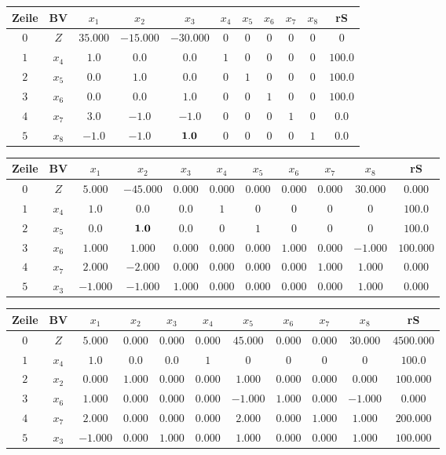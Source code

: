 \documentclass[a4paper]{article}
\begin{document}
\begin{tabular}{|c|c|ccc|ccccc|c|} \hline
Zeile & BV & $x_1$ &$x_2$ &$x_3$ &$x_4$ &$x_5$ &$x_6$ &$x_7$ &$x_8$ & rS \\ \hline
$0$ & $Z$ & $35.000$ &$-15.000$ &$-30.000$ &$0$ &$0$ &$0$ &$0$ &$0$ & $0$ \\ \hline
$1$ & $x_4$ & $1.0$ &$0.0$ &$0.0$ &$1$ &$0$ &$0$ &$0$ &$0$ & $100.0$ \\ 
$2$ & $x_5$ & $0.0$ &$1.0$ &$0.0$ &$0$ &$1$ &$0$ &$0$ &$0$ & $100.0$ \\ 
$3$ & $x_6$ & $0.0$ &$0.0$ &$1.0$ &$0$ &$0$ &$1$ &$0$ &$0$ & $100.0$ \\ 
$4$ & $x_7$ & $3.0$ &$-1.0$ &$-1.0$ &$0$ &$0$ &$0$ &$1$ &$0$ & $0.0$ \\ 
$5$ & $x_8$ & $-1.0$ &$-1.0$ &$\bf 1.0$ &$0$ &$0$ &$0$ &$0$ &$1$ & $0.0$ \\ 
\hline\end{tabular}

\begin{tabular}{|c|c|ccc|ccccc|c|} \hline
Zeile & BV & $x_1$ &$x_2$ &$x_3$ &$x_4$ &$x_5$ &$x_6$ &$x_7$ &$x_8$ & rS \\ \hline
$0$ & $Z$ & $5.000$ &$-45.000$ &$0.000$ &$0.000$ &$0.000$ &$0.000$ &$0.000$ &$30.000$ & $0.000$ \\ \hline
$1$ & $x_4$ & $1.0$ &$0.0$ &$0.0$ &$1$ &$0$ &$0$ &$0$ &$0$ & $100.0$ \\ 
$2$ & $x_5$ & $0.0$ &$\bf 1.0$ &$0.0$ &$0$ &$1$ &$0$ &$0$ &$0$ & $100.0$ \\ 
$3$ & $x_6$ & $1.000$ &$1.000$ &$0.000$ &$0.000$ &$0.000$ &$1.000$ &$0.000$ &$-1.000$ & $100.000$ \\ 
$4$ & $x_7$ & $2.000$ &$-2.000$ &$0.000$ &$0.000$ &$0.000$ &$0.000$ &$1.000$ &$1.000$ & $0.000$ \\ 
$5$ & $x_3$ & $-1.000$ &$-1.000$ &$1.000$ &$0.000$ &$0.000$ &$0.000$ &$0.000$ &$1.000$ & $0.000$ \\ 
\hline\end{tabular}

\begin{tabular}{|c|c|ccc|ccccc|c|} \hline
Zeile & BV & $x_1$ &$x_2$ &$x_3$ &$x_4$ &$x_5$ &$x_6$ &$x_7$ &$x_8$ & rS \\ \hline
$0$ & $Z$ & $5.000$ &$0.000$ &$0.000$ &$0.000$ &$45.000$ &$0.000$ &$0.000$ &$30.000$ & $4500.000$ \\ \hline
$1$ & $x_4$ & $1.0$ &$0.0$ &$0.0$ &$1$ &$0$ &$0$ &$0$ &$0$ & $100.0$ \\ 
$2$ & $x_2$ & $0.000$ &$1.000$ &$0.000$ &$0.000$ &$1.000$ &$0.000$ &$0.000$ &$0.000$ & $100.000$ \\ 
$3$ & $x_6$ & $1.000$ &$0.000$ &$0.000$ &$0.000$ &$-1.000$ &$1.000$ &$0.000$ &$-1.000$ & $0.000$ \\ 
$4$ & $x_7$ & $2.000$ &$0.000$ &$0.000$ &$0.000$ &$2.000$ &$0.000$ &$1.000$ &$1.000$ & $200.000$ \\ 
$5$ & $x_3$ & $-1.000$ &$0.000$ &$1.000$ &$0.000$ &$1.000$ &$0.000$ &$0.000$ &$1.000$ & $100.000$ \\ 
\hline\end{tabular}
\end{document}
